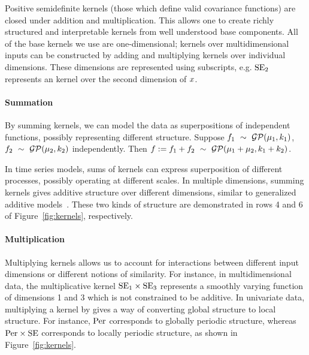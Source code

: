 \documentclass[twoside]{article}
\begin{document}
Positive semidefinite kernels (\ie those which define valid covariance functions) are closed under addition and multiplication.
This allows one to create richly structured and interpretable kernels from well understood base components.
All of the base kernels we use are one-dimensional; kernels over multidimensional inputs can be constructed by adding and multiplying kernels over individual dimensions.
These dimensions are represented using subscripts, e.g. $\textrm{SE}_2$ represents an \kSE kernel over the second dimension of $x$.
%


\paragraph{Summation}

By summing kernels, we can model the data as superpositions of independent functions, possibly representing different structure.
Suppose ${f_1 \ \sim\  \mathcal{GP}(\mu_1, k_1)}$, ${f_2 \ \sim\  \mathcal{GP}(\mu_2, k_2)}$ independently.
Then ${f := f_1 + f_2 \ \sim\  \mathcal{GP}(\mu_1 + \mu_2, k_1 + k_2)}$.

In time series models, sums of kernels can express superposition of different processes, possibly operating at different scales.
In multiple dimensions, summing kernels gives additive structure over different dimensions, similar to generalized additive models~\citep{hastie1990generalized}.
These two kinds of structure are demonstrated in rows 4 and 6 of Figure~\ref{fig:kernels}, respectively.


\paragraph{Multiplication}

Multiplying kernels allows us to account for interactions between different input dimensions or different notions of similarity. 
For instance, in multidimensional data, the multiplicative kernel $\textrm{SE}_1 \times \textrm{SE}_3$ represents a smoothly varying function of dimensions 1 and 3 which is not constrained to be additive.
In univariate data, multiplying a kernel by \kSE gives a way of converting global structure to local structure. 
For instance, $\textrm{Per}$ corresponds to globally periodic structure, whereas $\textrm{Per} \times \textrm{SE}$ corresponds to locally periodic structure, as shown in Figure~\ref{fig:kernels}.
\end{document}
